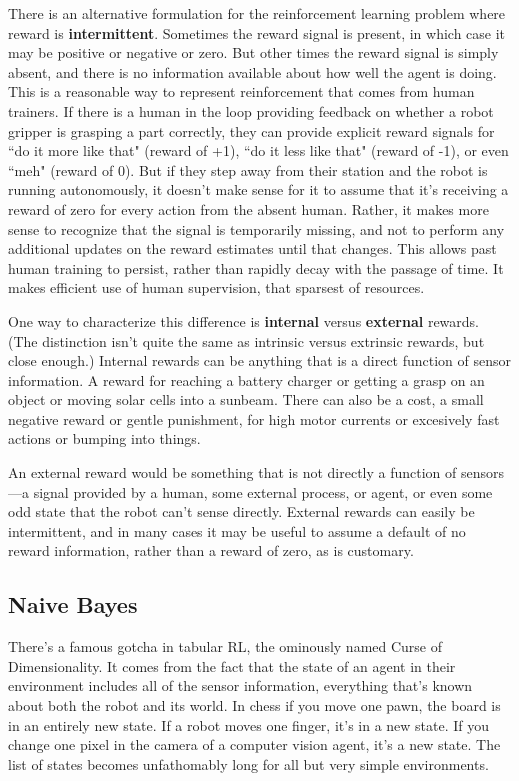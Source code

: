 There is an alternative formulation for the reinforcement learning problem where
reward is \textbf{intermittent}. Sometimes the reward signal is present, in which case
it may be positive or negative or zero. But other times the reward signal is
simply absent, and there is no information available about how well the agent is doing.
This is a reasonable way to represent reinforcement that comes from human trainers.
If there is a human in the loop providing feedback on whether a robot gripper
is grasping a part correctly, they can provide explicit reward signals for ``do it
more like that" (reward of +1), ``do it less like that" (reward of -1), or even
``meh" (reward of 0). But if they step away from their station and the robot
is running autonomously, it doesn’t make sense for it to assume that it’s
receiving a reward of zero for every action from the absent human. Rather, it makes
more sense to recognize that the signal is temporarily missing, and not to perform
any additional updates on the reward estimates until that changes. This allows past
human training to persist, rather than rapidly decay with the passage of time.
It makes efficient use of human supervision, that sparsest of resources.

One way to characterize this difference is \textbf{internal} versus \textbf{external} rewards.
(The distinction isn't quite the same as intrinsic versus extrinsic rewards, but close enough.)
Internal rewards can be anything that is a direct function of sensor information.
A reward for reaching a battery charger or getting a grasp on an object or
moving solar cells into a sunbeam. There can also be a cost, a small negative reward
or gentle punishment, for high motor currents or excesively fast actions or
bumping into things.

An external reward would be something that is not directly a function of
sensors---a signal provided by a human, some external process, or agent,
or even some odd state
that the robot can’t sense directly. External rewards can easily be intermittent,
and in many cases it may be useful to assume a default of no reward information,
rather than a reward of zero, as is customary.

\subsection{Naive Bayes}
\label{subsec:intronaivebayes}

There's a famous gotcha in tabular RL, the ominously named
Curse of Dimensionality. It comes from the fact that the state of
an agent in their environment includes all of the sensor information,
everything that's known about both the robot and its world. In chess if you move
one pawn, the board is in an entirely new state. If a robot moves one finger,
it's in a new state. If you change one pixel in the camera of a
computer vision agent, it's a new state. The list of states becomes
unfathomably long for all but very simple environments.

